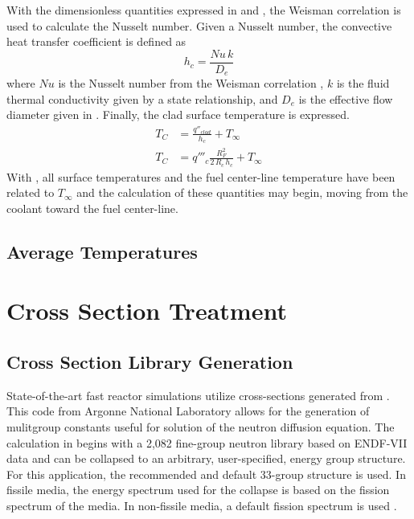       With the dimensionless quantities expressed in  and
      , the Weisman correlation is used to calculate the Nusselt
      number. Given a Nusselt number, the convective heat transfer coefficient
      is defined as
      \begin{equation}
        \label{eq:hc}
        h_c = \frac{Nu \, k}{D_e}
      \end{equation}
      where $Nu$ is the Nusselt number from the Weisman correlation
      , $k$ is the fluid thermal conductivity given by a state
      relationship, and $D_e$ is the effective flow diameter given in
      . Finally, the clad surface temperature is expressed.
      \begin{align}
        T_C &= \frac{q''_{clad}}{h_c} + T_{\infty} \\
        \label{eq:tc}
        T_C &= q'''_c \frac{R_F^2}{2\,R_c\,h_c} + T_{\infty}
      \end{align}
      With , all surface temperatures and the fuel center-line
      temperature have been related to $T_{\infty}$ and the calculation of these
      quantities may begin, moving from the coolant toward the fuel center-line.

  \subsection{Average Temperatures}
    \label{sec:average_temps}

\section{Cross Section Treatment}
  \subsection{Cross Section Library Generation}
    State-of-the-art fast reactor simulations utilize cross-sections generated
    from \mcc. This code from Argonne National Laboratory allows for the
    generation of mulitgroup constants useful for solution of the neutron
    diffusion equation. The calculation in \mcc begins with a 2,082 fine-group
    neutron library based on ENDF-VII data and can be collapsed to an
    arbitrary, user-specified, energy group structure. For this application, the
    recommended and default 33-group structure is used. In fissile media, the
    energy spectrum used for the collapse is based on the fission spectrum of
    the media. In non-fissile media, a default  fission spectrum
    is used \cite{mcc}.
    
